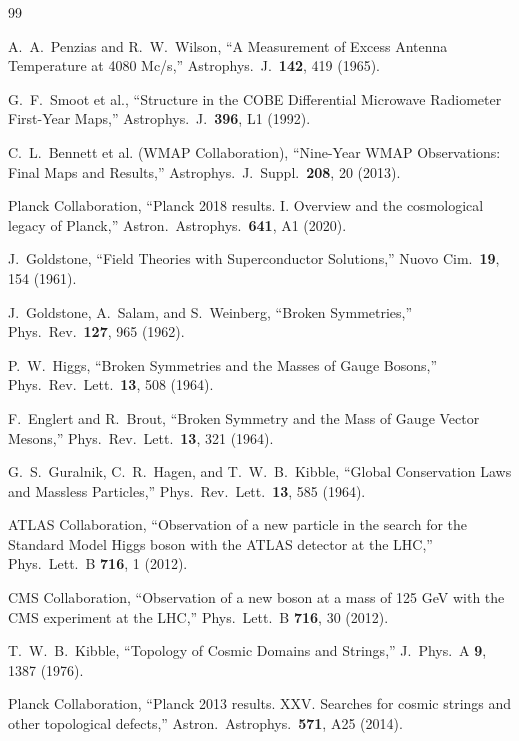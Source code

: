 \documentclass[11pt]{article}
\begin{document}
\begin{thebibliography}{99}

 A.~A.~Penzias and R.~W.~Wilson, ``A Measurement of Excess Antenna Temperature at 4080 Mc/s,'' Astrophys.\ J.\ \textbf{142}, 419 (1965).

 G.~F.~Smoot et al., ``Structure in the COBE Differential Microwave Radiometer First-Year Maps,'' Astrophys.\ J.\ \textbf{396}, L1 (1992).

 C.~L.~Bennett et al. (WMAP Collaboration), ``Nine-Year WMAP Observations: Final Maps and Results,'' Astrophys.\ J.\ Suppl.\ \textbf{208}, 20 (2013).

 Planck Collaboration, ``Planck 2018 results. I. Overview and the cosmological legacy of Planck,'' Astron.\ Astrophys.\ \textbf{641}, A1 (2020).

 J.~Goldstone, ``Field Theories with Superconductor Solutions,'' Nuovo Cim.\ \textbf{19}, 154 (1961).

 J.~Goldstone, A.~Salam, and S.~Weinberg, ``Broken Symmetries,'' Phys.\ Rev.\ \textbf{127}, 965 (1962).

 P.~W.~Higgs, ``Broken Symmetries and the Masses of Gauge Bosons,'' Phys.\ Rev.\ Lett.\ \textbf{13}, 508 (1964).

 F.~Englert and R.~Brout, ``Broken Symmetry and the Mass of Gauge Vector Mesons,'' Phys.\ Rev.\ Lett.\ \textbf{13}, 321 (1964).

 G.~S.~Guralnik, C.~R.~Hagen, and T.~W.~B.~Kibble, ``Global Conservation Laws and Massless Particles,'' Phys.\ Rev.\ Lett.\ \textbf{13}, 585 (1964).

 ATLAS Collaboration, ``Observation of a new particle in the search for the Standard Model Higgs boson with the ATLAS detector at the LHC,'' Phys.\ Lett.\ B \textbf{716}, 1 (2012).

 CMS Collaboration, ``Observation of a new boson at a mass of 125 GeV with the CMS experiment at the LHC,'' Phys.\ Lett.\ B \textbf{716}, 30 (2012).

 T.~W.~B.~Kibble, ``Topology of Cosmic Domains and Strings,'' J.\ Phys.\ A \textbf{9}, 1387 (1976).

 Planck Collaboration, ``Planck 2013 results. XXV. Searches for cosmic strings and other topological defects,'' Astron.\ Astrophys.\ \textbf{571}, A25 (2014).


\end{thebibliography}
\end{document}
